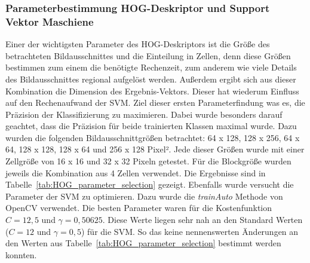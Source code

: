 \subsubsection{Parameterbestimmung HOG-Deskriptor und Support Vektor Maschiene} \label{sssec:HOG:parmeter}
Einer der wichtigsten Parameter des HOG-Deskriptors ist die Größe des betrachteten Bildausschnittes und die Einteilung in Zellen, denn diese Größen bestimmen zum einem die benötigte Rechenzeit, zum anderem wie viele Details des Bildausschnittes regional aufgelöst werden. Außerdem ergibt sich aus dieser Kombination die Dimension des Ergebnis-Vektors. Dieser hat wiederum Einfluss auf den Rechenaufwand der SVM. Ziel dieser ersten Parameterfindung was es, die Präzision der Klassifizierung zu maximieren. Dabei wurde besonders darauf geachtet, dass die Präzision für beide trainierten Klassen maximal wurde. Dazu wurden die folgenden Bildausschnittgrößen betrachtet: 64 x 128, 128  x 256, 64 x 64, 128 x 128, 128 x 64 und 256 x 128 Pixel². Jede dieser Größen wurde mit einer Zellgröße von 16 x 16 und 32 x 32 Pixeln getestet. Für die Blockgröße wurden jeweils die Kombination aus 4 Zellen verwendet. Die Ergebnisse sind in Tabelle~\ref{tab:HOG_parameter_selection} gezeigt.  
Ebenfalls wurde versucht die Parameter der SVM zu optimieren. Dazu wurde die \textit{trainAuto} Methode von OpenCV verwendet. Die besten Parameter waren für die Kostenfunktion $C=12,5$ und $\gamma=0,50625$. Diese Werte liegen sehr nah an den Standard Werten ($C=12$ und $\gamma=0,5$) für die SVM. So das keine nennenswerten Änderungen an den Werten aus Tabelle~\ref{tab:HOG_parameter_selection} bestimmt werden konnten.

